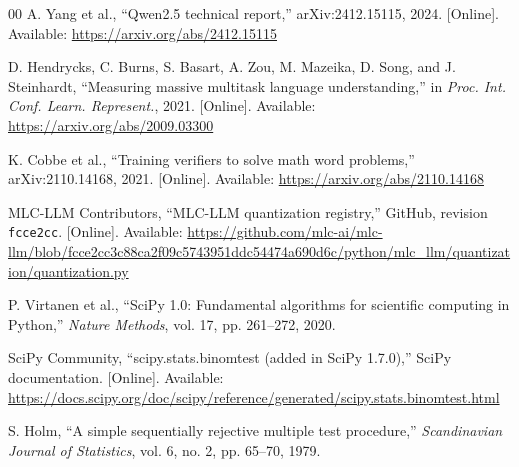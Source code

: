 \documentclass[conference]{IEEEtran}
\begin{document}
\begin{thebibliography}{00}
A. Yang et al.,
``Qwen2.5 technical report,''
arXiv:2412.15115, 2024.
[Online]. Available:
\url{https://arxiv.org/abs/2412.15115}

D. Hendrycks, C. Burns, S. Basart, A. Zou, M. Mazeika,
D. Song, and J. Steinhardt,
``Measuring massive multitask language understanding,''
in \emph{Proc. Int. Conf. Learn. Represent.}, 2021.
[Online]. Available:
\url{https://arxiv.org/abs/2009.03300}

K. Cobbe et al.,
``Training verifiers to solve math word problems,''
arXiv:2110.14168, 2021.
[Online]. Available:
\url{https://arxiv.org/abs/2110.14168}

MLC-LLM Contributors,
``MLC-LLM quantization registry,''
GitHub, revision \texttt{fcce2cc}.
[Online]. Available:
\url{https://github.com/mlc-ai/mlc-llm/blob/fcce2cc3c88ca2f09c5743951ddc54474a690d6c/python/mlc_llm/quantization/quantization.py}

P. Virtanen et al.,
``SciPy 1.0: Fundamental algorithms for scientific computing in
Python,''
\emph{Nature Methods}, vol. 17, pp. 261--272, 2020.

SciPy Community,
``scipy.stats.binomtest (added in SciPy 1.7.0),''
SciPy documentation.
[Online]. Available:
\url{https://docs.scipy.org/doc/scipy/reference/generated/scipy.stats.binomtest.html}

S. Holm,
``A simple sequentially rejective multiple test procedure,''
\emph{Scandinavian Journal of Statistics},
vol. 6, no. 2, pp. 65--70, 1979.

\end{thebibliography}
\end{document}

